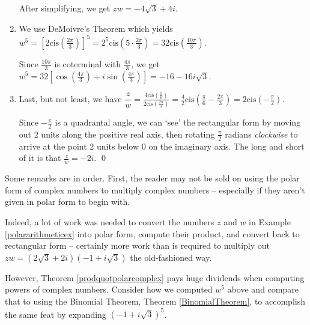 \documentclass{ximera}
\begin{document}
\begin{ex}
\begin{enumerate}
\smallskip

 After simplifying, we get $zw = -4\sqrt{3} + 4i$.

\item We use DeMoivre's Theorem which yields $w^{5} = \left[2\text{cis}\left(\frac{2\pi}{3}\right)\right]^{5} = 2^{5} \text{cis} \left(5\cdot \frac{2\pi}{3}\right) = 32 \text{cis}\left(\frac{10\pi}{3}\right)$.  

\smallskip

Since $\frac{10\pi}{3}$ is coterminal with $\frac{4\pi}{3}$, we get $w^{5} = 32\left[ \cos\left(\frac{4\pi}{3}\right) + i\sin\left(\frac{4\pi}{3}\right) \right] = -16-16i\sqrt{3}$.

\item  Last, but not least, we have $\dfrac{z}{w} = \frac{4 \text{cis}\left(\frac{\pi}{6}\right)}{2\text{cis}\left(\frac{2\pi}{3}\right)} = \frac{4}{2} \text{cis}\left(\frac{\pi}{6} - \frac{2\pi}{3}\right) = 2\text{cis}\left(-\frac{\pi}{2}\right)$.  

\smallskip

Since $-\frac{\pi}{2}$ is a quadrantal angle, we can `see' the rectangular form by moving out $2$ units along the positive real axis, then rotating $\frac{\pi}{2}$ radians \textit{clockwise} to arrive at the point $2$ units below $0$ on the imaginary axis.  The long and short of it is that $\frac{z}{w} = -2i$. \qed

\end{enumerate}

\end{ex}

Some remarks are in order.  First, the reader may not be sold on using the polar form of complex numbers to multiply complex numbers -- especially if they aren't given in polar form to begin with. 

\smallskip

Indeed, a lot of work was needed to convert the numbers $z$ and $w$ in Example \ref{polararithmeticex} into polar form, compute their product, and convert back to rectangular form -- certainly more work than is required to multiply out $zw =  (2\sqrt{3} + 2i)(-1 + i\sqrt{3})$ the old-fashioned way.  

\smallskip

However, Theorem \ref{prodquotpolarcomplex} pays huge dividends when computing powers of complex numbers.  Consider how we computed $w^{5}$ above and compare that to using the Binomial Theorem, Theorem \ref{BinomialTheorem}, to accomplish the same feat by expanding  $(-1 + i\sqrt{3})^{5}$. 
\end{document}
